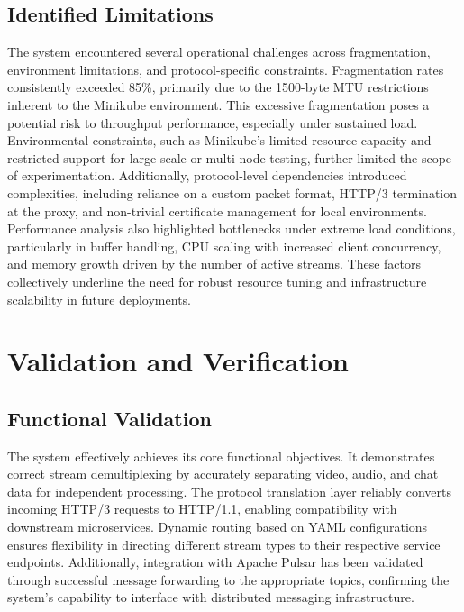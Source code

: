 \subsection{Identified Limitations}

The system encountered several operational challenges across fragmentation, environment limitations, and protocol-specific constraints. Fragmentation rates consistently exceeded 85\%, primarily due to the 1500-byte MTU restrictions inherent to the Minikube environment. This excessive fragmentation poses a potential risk to throughput performance, especially under sustained load. Environmental constraints, such as Minikube’s limited resource capacity and restricted support for large-scale or multi-node testing, further limited the scope of experimentation. Additionally, protocol-level dependencies introduced complexities, including reliance on a custom packet format, HTTP/3 termination at the proxy, and non-trivial certificate management for local environments. Performance analysis also highlighted bottlenecks under extreme load conditions, particularly in buffer handling, CPU scaling with increased client concurrency, and memory growth driven by the number of active streams. These factors collectively underline the need for robust resource tuning and infrastructure scalability in future deployments.

\section{Validation and Verification}



\subsection{Functional Validation}

The system effectively achieves its core functional objectives. It demonstrates correct stream demultiplexing by accurately separating video, audio, and chat data for independent processing. The protocol translation layer reliably converts incoming HTTP/3 requests to HTTP/1.1, enabling compatibility with downstream microservices. Dynamic routing based on YAML configurations ensures flexibility in directing different stream types to their respective service endpoints. Additionally, integration with Apache Pulsar has been validated through successful message forwarding to the appropriate topics, confirming the system's capability to interface with distributed messaging infrastructure.


